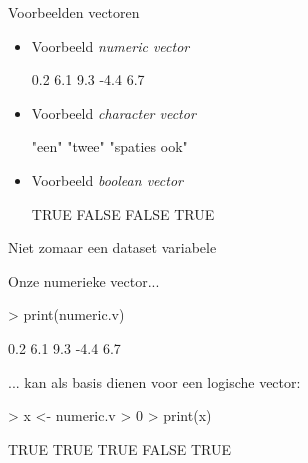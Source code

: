 \documentclass{beamer}
\begin{document}


\begin{frame}[fragile]{Voorbeelden vectoren}



\begin{itemize}

\item
Voorbeeld \textit{numeric vector}
\begin{Schunk}
\begin{Soutput}
[1]  0.2  6.1  9.3 -4.4  6.7
\end{Soutput}
\end{Schunk}
\vspace{30pt}
\item
Voorbeeld \textit{character vector}
\begin{Schunk}
\begin{Soutput}
[1] "een"         "twee"        "spaties ook"
\end{Soutput}
\end{Schunk}
\vspace{30pt}
\item
Voorbeeld \textit{boolean vector}
\begin{Schunk}
\begin{Soutput}
[1]  TRUE FALSE FALSE  TRUE
\end{Soutput}
\end{Schunk}
\end{itemize}
\end{frame}


\begin{frame}[fragile]{Niet zomaar een dataset variabele}

Onze numerieke vector... 
\begin{Schunk}
\begin{Sinput}
> print(numeric.v)
\end{Sinput}
\begin{Soutput}
[1]  0.2  6.1  9.3 -4.4  6.7
\end{Soutput}
\end{Schunk}
\vspace{20pt}
... kan als basis dienen voor een logische vector: 
\begin{Schunk}
\begin{Sinput}
> x <- numeric.v > 0
> print(x)
\end{Sinput}
\begin{Soutput}
[1]  TRUE  TRUE  TRUE FALSE  TRUE
\end{Soutput}
\end{Schunk}


\end{frame}
\end{document}

